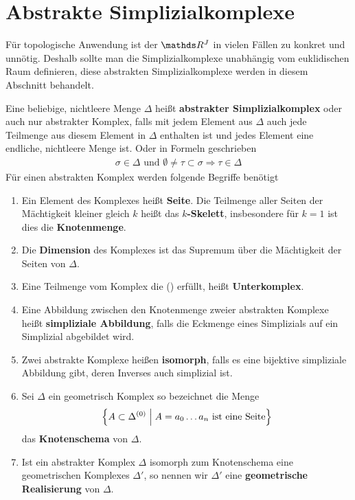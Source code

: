 
\section{Abstrakte Simplizialkomplexe}

Für topologische Anwendung ist der $\R^J$ in vielen Fällen zu konkret
und unnötig. Deshalb sollte man die Simplizialkomplexe unabhängig vom
euklidischen Raum definieren, diese abstrakten Simplizialkomplexe
werden in diesem Abschnitt behandelt.

\begin{Def}
  Eine beliebige, nichtleere Menge $\Delta$ heißt \textbf{abstrakter
    Simplizialkomplex} oder auch nur abstrakter Komplex, falls mit
  jedem Element aus $\Delta$ auch jede Teilmenge aus diesem Element in
  $\Delta$ enthalten ist und jedes Element eine endliche, nichtleere
  Menge ist. Oder in Formeln geschrieben
\renewcommand*{\theequation}{\textbullet}
  \begin{gather}
    \sigma \in \Delta \text{ und } \emptyset \neq \tau \subset \sigma
    \Rightarrow \tau \in \Delta
  \end{gather}
  Für einen abstrakten Komplex werden folgende Begriffe benötigt
  \begin{enumerate}[({A}1)]
  \item Ein Element des Komplexes heißt \textbf{Seite}. Die Teilmenge aller
    Seiten der Mächtigkeit kleiner gleich $k$ heißt das \textbf{$k$-Skelett},
    insbesondere für $k=1$ ist dies die \textbf{Knotenmenge}.
  \item Die \textbf{Dimension} des Komplexes ist das Supremum über die
    Mächtigkeit der Seiten von $\Delta$.
  \item Eine Teilmenge vom Komplex die (\textbullet) erfüllt, heißt
    \textbf{Unterkomplex}.
  \item Eine Abbildung zwischen den Knotenmenge zweier abstrakten
    Komplexe heißt \textbf{simpliziale Abbildung}, falls die Eckmenge eines
    Simplizials auf ein Simplizial abgebildet wird.
  \item Zwei abstrakte Komplexe heißen \textbf{isomorph}, falls es eine
    bijektive simpliziale Abbildung gibt, deren Inverses auch
    simplizial ist.
  \item Sei $\Delta$ ein geometrisch Komplex so bezeichnet die Menge
    \begin{gather*}
      \left\{  A \subset \Delta^{(0) } \; \Big| \;  A = a_0 \ldots a_n \text{ ist
          eine Seite} \right\}
    \end{gather*}
    das \textbf{Knotenschema} von $\Delta$.
  \item Ist ein abstrakter Komplex $\Delta$ isomorph zum Knotenschema
    eine geometrischen Komplexes $\Delta'$, so nennen wir $\Delta'$
    eine \textbf{geometrische Realisierung} von $\Delta$.
  \end{enumerate}
\end{Def}

